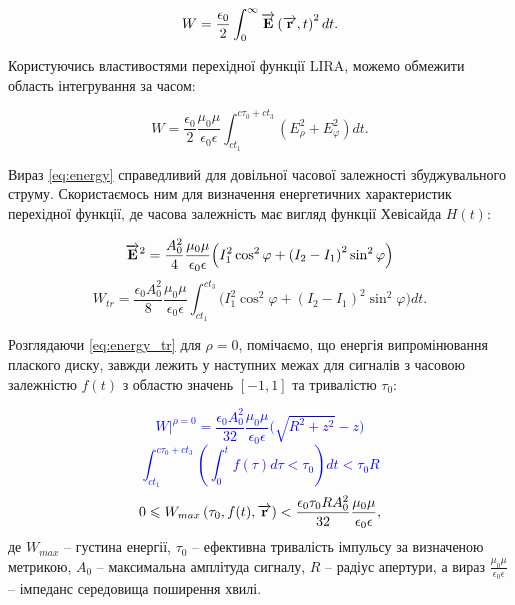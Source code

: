 \begin{equation} \label{eq:energy}
W = \frac{\epsilon_0}{2} \int_0^\infty \overrightarrow{\mathbf E} \left( \overrightarrow{\mathbf r},t \right)^2 dt.
\end{equation}

Користуючись властивостями перехідної функції LIRA, можемо обмежити
область інтегрування за часом:

\begin{equation} \label{eq:energy}
W = \frac{\epsilon_0}{2} \frac{\mu_0 \mu}{\epsilon_0 \epsilon}
\int_{ct_1}^{c\tau_0+ct_3} \left( E_\rho^2 + E_\varphi^2 \right) dt.
\end{equation}

Вираз \eqref{eq:energy} справедливий для довільної часової залежності 
збуджувального струму. Скористаємось ним для визначення енергетичних 
характеристик перехідної функції, де часова залежність має вигляд функції
Хевісайда $ H(t) $:

\textcolor{blue}{ \begin{equation*} \begin{aligned}
\overrightarrow{\mathbf E}^2 = \frac{A_0^2}{4} \frac{\mu_0 \mu}{\epsilon_0 \epsilon}
\Big( I_1^2 \cos^2 \varphi + \left( I_2 - I_1 \right)^2 \sin^2 \varphi \Big)
\end{aligned} \end{equation*} }
%
\begin{equation} \label{eq:energy_tr}
W_{tr} = \frac{\epsilon_0 A_0^2}{8} \frac{\mu_0 \mu}{\epsilon_0 \epsilon}
\int_{ct_1}^{ct_3}  \Big( I_1^2 \cos^2 \varphi + 
\left( I_2 - I_1 \right)^2 \sin^2 \varphi \Big) dt.
\end{equation}

Розглядаючи \ref{eq:energy_tr} для $ \rho = 0 $, помічаємо, що енергія 
випромінювання плаского диску, завжди лежить у наступних межах для 
сигналів з часовою залежністю $ f(t) $ з областю значень 
$ \left[ -1, 1 \right] $ та тривалістю $ \tau_0 $:

\textcolor{blue}{ \begin{equation*}
\left. W \right|^{\rho=0} = \frac{\epsilon_0 A_0^2}{32} 
\frac{\mu_0 \mu}{\epsilon_0 \epsilon} \Big( \sqrt{R^2+z^2} - z \Big)
\end{equation*} }
%
\textcolor{blue}{ \begin{equation*}
\int_{ct_1}^{c\tau_0+ct_3} 
\left( \int_0^t f(\tau) d \tau < \tau_0 \right) dt < \tau_0 R
\end{equation*} }
%
\begin{equation}
0 \leqslant W_{max} \left( \tau_0, f(t), \overrightarrow{\mathbf r} \right) < 
\frac{\epsilon_0 \tau_0 R A_0^2}{32} \frac{\mu_0 \mu}{\epsilon_0 \epsilon},
\end{equation}
%
де $ W_{max} $ -- густина енергії, $ \tau_0 $ -- ефективна тривалість імпульсу 
за визначеною метрикою, $ A_0 $ -- максимальна амплітуда сигналу, $ R $ -- 
радіус апертури, а вираз $ \frac{\mu_0 \mu}{\epsilon_0 \epsilon} $ -- імпеданс 
середовища поширення хвилі.

